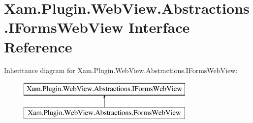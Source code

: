 \hypertarget{interface_xam_1_1_plugin_1_1_web_view_1_1_abstractions_1_1_i_forms_web_view}{}\section{Xam.\+Plugin.\+Web\+View.\+Abstractions.\+I\+Forms\+Web\+View Interface Reference}
\label{interface_xam_1_1_plugin_1_1_web_view_1_1_abstractions_1_1_i_forms_web_view}
Inheritance diagram for Xam.\+Plugin.\+Web\+View.\+Abstractions.\+I\+Forms\+Web\+View\+:\begin{figure}[H]
\begin{center}
\leavevmode
\includegraphics[height=2.000000cm]{interface_xam_1_1_plugin_1_1_web_view_1_1_abstractions_1_1_i_forms_web_view}
\end{center}
\end{figure}
